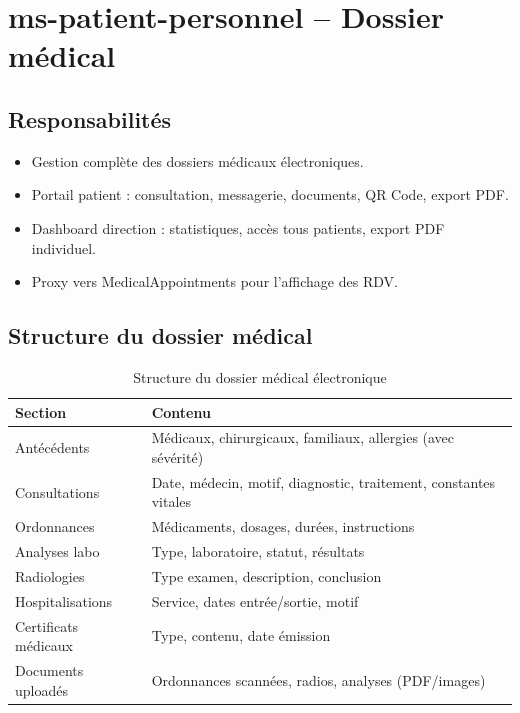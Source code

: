 \section{ms-patient-personnel -- Dossier médical}

\subsection{Responsabilités}
\begin{itemize}[itemsep=3pt]
  \item Gestion complète des dossiers médicaux électroniques.
  \item Portail patient : consultation, messagerie, documents, QR Code, export PDF.
  \item Dashboard direction : statistiques, accès tous patients, export PDF individuel.
  \item Proxy vers MedicalAppointments pour l'affichage des RDV.
\end{itemize}

\subsection{Structure du dossier médical}

\begin{table}[H]
\centering
\renewcommand{\arraystretch}{1.3}
\begin{tabular}{|l|l|}
\hline
\rowcolor{tabhead}\color{white}\textbf{Section} &
\color{white}\textbf{Contenu} \\
\hline
Antécédents & Médicaux, chirurgicaux, familiaux, allergies (avec sévérité) \\
\rowcolor{roweven}
Consultations & Date, médecin, motif, diagnostic, traitement, constantes vitales \\
Ordonnances & Médicaments, dosages, durées, instructions \\
\rowcolor{roweven}
Analyses labo & Type, laboratoire, statut, résultats \\
Radiologies & Type examen, description, conclusion \\
\rowcolor{roweven}
Hospitalisations & Service, dates entrée/sortie, motif \\
Certificats médicaux & Type, contenu, date émission \\
\rowcolor{roweven}
Documents uploadés & Ordonnances scannées, radios, analyses (PDF/images) \\
\hline
\end{tabular}
\caption{Structure du dossier médical électronique}
\end{table}


